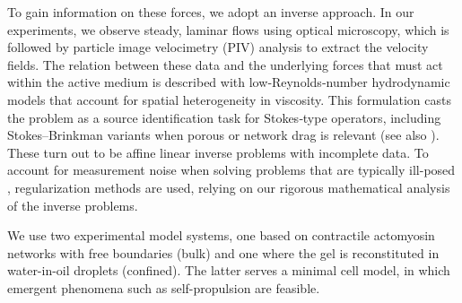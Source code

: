 \documentclass[final,leqno]{scrarticle}
\begin{document}
To gain information on these forces, we adopt an inverse approach. In our experiments, we observe steady, laminar flows using optical microscopy, which is followed by particle image velocimetry (PIV) analysis \cite{PIV1,PIV2} to extract the velocity fields. The relation between these data and the underlying forces that must act within the active medium is described with low‑Reynolds‑number hydrodynamic models that account for spatial heterogeneity in viscosity. This formulation casts the problem as a source identification task for Stokes‑type operators, including Stokes–Brinkman variants when porous or network drag is relevant (see also \cite{Lechleiter13}). These turn out to be affine linear inverse problems with incomplete data. To account for measurement noise when solving problems that are typically ill-posed \cite{hadamard1923,bh00}, regularization methods \cite{benning_burger_2018,ehn00,skhk12} are used, relying on our rigorous mathematical analysis of the inverse problems.

We use two experimental model systems, one based on contractile actomyosin networks with free boundaries (bulk) and one where the gel is reconstituted in water-in-oil droplets (confined). The latter serves a minimal cell model, in which emergent phenomena such as self-propulsion are feasible.

\end{document}
